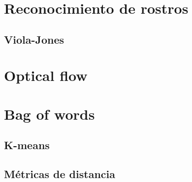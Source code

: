 \section{Reconocimiento de rostros}
\label{sec:rec_rostros}

	\subsection{Viola-Jones}
	\label{sec:viola-jones}

\section{Optical flow}
\label{sec:optical_flow}

\section{Bag of words}
\label{sec:bag_of_words}

	\subsection{K-means}
	\label{sec:k-means}
	
	\subsection{Métricas de distancia}
	\label{sec:matricas_de_distancia}